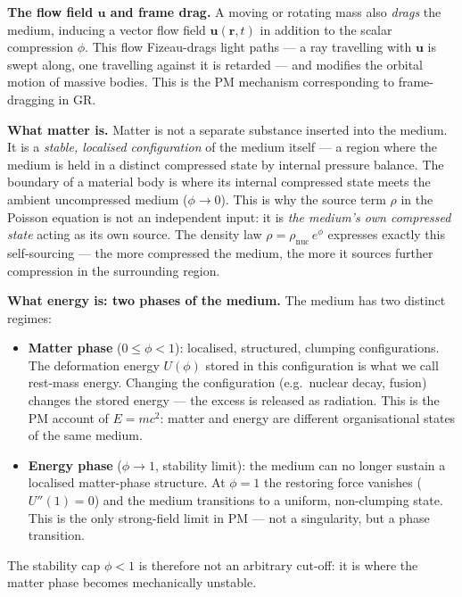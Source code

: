 \documentclass[10pt,twocolumn]{article}
\begin{document}
\textbf{The flow field $\mathbf{u}$ and frame drag.}
A moving or rotating mass also \emph{drags} the medium, inducing a vector
flow field $\mathbf{u}(\mathbf{r},t)$ in addition to the scalar compression
$\phi$.  This flow Fizeau-drags light paths — a ray travelling with
$\mathbf{u}$ is swept along, one travelling against it is retarded — and
modifies the orbital motion of massive bodies.  This is the PM mechanism
corresponding to frame-dragging in GR.

\textbf{What matter is.}
Matter is not a separate substance inserted into the medium.  It is a
\emph{stable, localised configuration} of the medium itself — a region where
the medium is held in a distinct compressed state by internal pressure
balance.  The boundary of a material body is where its internal compressed
state meets the ambient uncompressed medium ($\phi \to 0$).  This is why the
source term $\rho$ in the Poisson equation is not an independent input: it is
\emph{the medium's own compressed state} acting as its own source.  The
density law $\rho = \rho_{\mathrm{nuc}}\,e^{\phi}$ expresses exactly this
self-sourcing — the more compressed the medium, the more it sources further
compression in the surrounding region.

\textbf{What energy is: two phases of the medium.}
The medium has two distinct regimes:
\begin{itemize}\setlength{\itemsep}{1pt}
  \item \textbf{Matter phase} ($0 \leq \phi < 1$): localised, structured,
        clumping configurations.  The deformation energy $U(\phi)$ stored in
        this configuration is what we call rest-mass energy.  Changing the
        configuration (e.g.\ nuclear decay, fusion) changes the stored energy
        — the excess is released as radiation.  This is the PM account of
        $E = mc^2$: matter and energy are different organisational states of
        the same medium.
  \item \textbf{Energy phase} ($\phi \to 1$, stability limit): the medium
        can no longer sustain a localised matter-phase structure.  At $\phi=1$
        the restoring force vanishes ($U''(1) = 0$) and the medium transitions
        to a uniform, non-clumping state.  This is the only strong-field limit
        in PM — not a singularity, but a phase transition.
\end{itemize}
The stability cap $\phi < 1$ is therefore not an arbitrary cut-off: it is
where the matter phase becomes mechanically unstable.
\end{document}

